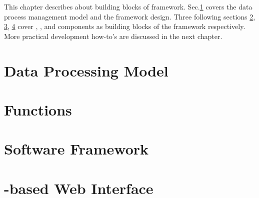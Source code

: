 
This chapter describes about building blocks of {\pubs} framework. Sec.\ref{pubs:model} covers the data process management model and the framework design.
Three following sections \ref{pubs:psql}, \ref{pubs:python}, \ref{pubs:php}
 cover {\psql}, {\python}, and {\php} components as building blocks of the 
framework respectively. More practical development how-to's are discussed 
in the next chapter.

\section{Data Processing Model}
\label{pubs:model}


\section{{\psql} Functions}
\label{pubs:psql}


\section{{\python} Software Framework}
\label{pubs:python}


\section{{\php}-based Web Interface}
\label{pubs:php}



